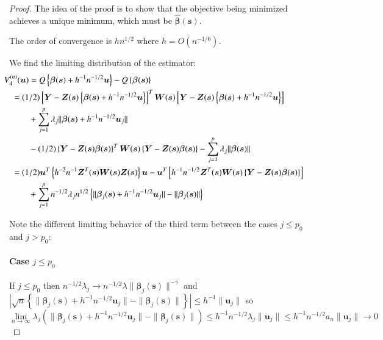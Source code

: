 \documentclass[authoryear, review, 11pt]{elsarticle}
\begin{document}
        \begin{proof}
            The idea of the proof is to show that the objective being minimized achieves a unique minimum, which must be $\hat{\bm{\beta}}(\bm{s})$.
    
            The order of convergence is $h n^{1/2}$ where $h = O(n^{-1/6})$.
    
            We find the limiting distribution of the estimator:
            \begin{align}\label{eq:consistency}
                \mkern-36mu V_4^{(n)}(\bm{u}) &= Q \left\{ \bm{\beta} (\bm{s}) + h^{-1} n^{-1/2} \bm{u} \right\} - Q \left\{ \bm{\beta}(\bm{s}) \right\} \notag \\
                &\mkern-36mu= (1/2) \left[ \bm{Y} - \bm{Z}(\bm{s}) \left\{ \bm{\beta}(\bm{s}) + h^{-1} n^{-1/2} \bm{u} \right\} \right]^T \bm{W}(\bm{s}) \left[ \bm{Y} - \bm{Z}(\bm{s}) \left\{ \bm{\beta}(\bm{s}) + h^{-1} n^{-1/2} \bm{u} \right\} \right] \notag \\
                &+ \sum_{j=1}^p \lambda_j \| \bm{\beta}(\bm{s}) + h^{-1} n^{-1/2} \bm{u}_j \| \notag \\
                &- (1/2) \left\{ \bm{Y} - \bm{Z}(\bm{s}) \bm{\beta}(\bm{s}) \right\}^T \bm{W}(\bm{s}) \left\{ \bm{Y} - \bm{Z}(\bm{s}) \bm{\beta}(\bm{s}) \right\} - \sum_{j=1}^p \lambda_j \| \bm{\beta}(\bm{s}) \| \notag \\ 
                &\mkern-36mu= (1/2) \bm{u}^T \left\{ h^{-2} n^{-1} \bm{Z}^T(\bm{s}) \bm{W}(\bm{s}) \bm{Z}(\bm{s}) \right\} \bm{u} - \bm{u}^T \left[ h^{-1} n^{-1/2} \bm{Z}^T(\bm{s}) \bm{W}(\bm{s}) \left\{ \bm{Y} - \bm{Z}(\bm{s}) \bm{\beta}(\bm{s}) \right\} \right] \notag \\
                &+ \sum_{j=1}^p n^{-1/2} \lambda_j n^{1/2} \left\{ \|\bm{\beta}_j(\bm{s}) + h^{-1} n^{-1/2} \bm{u}_j \| - \| \bm{\beta}_j(\bm{s}) \| \right\}
            \end{align}
        
            Note the different limiting behavior of the third term between the cases $j \le p_0$ and $j > p_0$:
        
            \paragraph{Case $j \le p_0$}
            If $j \le p_0$ then $n^{-1/2} \lambda_j \to n^{-1/2} \lambda \| \bm{\beta}_j(\bm{s}) \|^{-\gamma}$ and $| \sqrt{n} \left\{ \|\bm{\beta}_j(\bm{s}) + h^{-1} n^{-1/2} \bm{u}_j \| - \| \bm{\beta}_j(\bm{s}) \| \right\} | \le h^{-1} \| \bm{u}_j \|$ so $\lim \limits_{n \to \infty} \lambda_j \left( \|\bm{\beta}_j(\bm{s}) + h^{-1} n^{-1/2} \bm{u}_j \| - \| \bm{\beta}_j(\bm{s}) \| \right) \le h^{-1} n^{-1/2} \lambda_j  \| \bm{u}_j \| \le h^{-1} n^{-1/2} a_n \| \bm{u}_j \| \to 0$


\end{proof}
\end{document}
